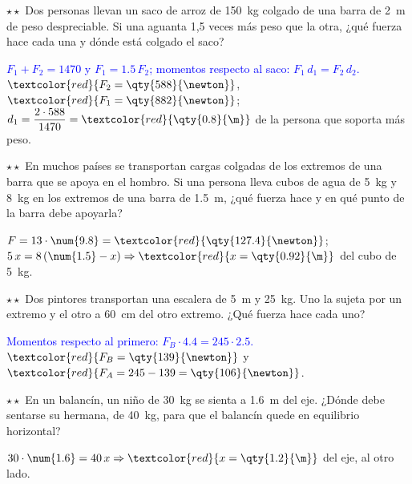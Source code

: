 \begin{exercise}
    \(\star\star\) Dos personas llevan un saco de arroz de \qty{150}{\kg} colgado de una barra de \qty{2}{\m} de peso despreciable.
    Si una aguanta 1,5 veces más peso que la otra, ¿qué fuerza hace cada una y dónde está colgado el saco?
    \begin{solu}
        \textcolor{blue}{\(F_1 + F_2 = 1470\) y \(F_1 = \num{1.5}\,F_2\); momentos respecto al saco: \(F_1\,d_1 = F_2\,d_2\).}
        \(\textcolor{red}{F_2 = \qty{588}{\newton}}\), \(\textcolor{red}{F_1 = \qty{882}{\newton}}\); \(d_1 = \dfrac{2 \cdot 588}{1470} =
        \textcolor{red}{\qty{0.8}{\m}}\) de la persona que soporta más peso.
    \end{solu}
\end{exercise}

\begin{exercise}
    \(\star\star\) En muchos países se transportan cargas colgadas de los extremos de una barra que se apoya en el hombro. Si una
    persona lleva cubos de agua de \qty{5}{\kg} y \qty{8}{\kg} en los extremos de una barra de \qty{1.5}{\m}, ¿qué fuerza hace y en
    qué punto de la barra debe apoyarla?
    \begin{solu}
        \(F = 13 \cdot \num{9.8} = \textcolor{red}{\qty{127.4}{\newton}}\); \(5\,x = 8\,(\num{1.5} - x) \Rightarrow
        \textcolor{red}{x = \qty{0.92}{\m}}\) del cubo de \qty{5}{\kg}.
    \end{solu}
\end{exercise}

\begin{exercise}
    \(\star\star\) Dos pintores transportan una escalera de \qty{5}{\m} y \qty{25}{\kg}. Uno la sujeta por un extremo y el otro a
    \qty{60}{\cm} del otro extremo. ¿Qué fuerza hace cada uno?
    \begin{solu}
        \textcolor{blue}{Momentos respecto al primero: \(F_B \cdot \num{4.4} = 245 \cdot \num{2.5}\).}
        \(\textcolor{red}{F_B = \qty{139}{\newton}}\) y \(\textcolor{red}{F_A = 245 - 139 = \qty{106}{\newton}}\).
    \end{solu}
\end{exercise}

\begin{exercise}
    \(\star\star\) En un balancín, un niño de \qty{30}{\kg} se sienta a \qty{1.6}{\m} del eje. ¿Dónde debe sentarse su hermana, de
    \qty{40}{\kg}, para que el balancín quede en equilibrio horizontal?
    \begin{solu}
        \(30 \cdot \num{1.6} = 40\,x \Rightarrow \textcolor{red}{x = \qty{1.2}{\m}}\) del eje, al otro lado.
    \end{solu}
\end{exercise}

